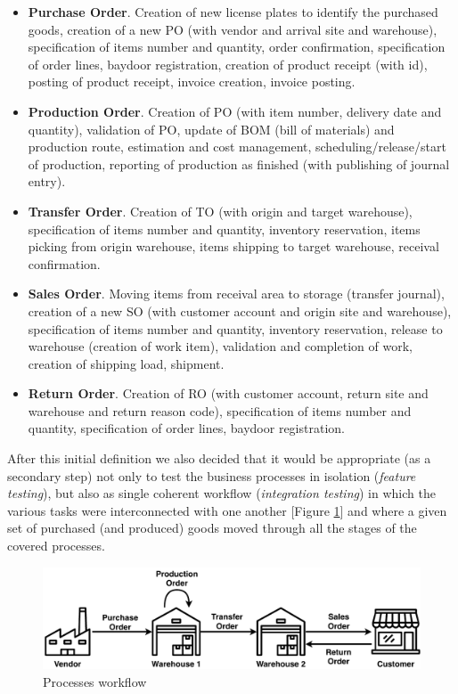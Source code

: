 \begin{itemize}
    \item \textbf{Purchase Order}. Creation of new license plates to identify the purchased goods, creation of a new PO (with vendor and arrival site and warehouse), specification of items number and quantity, order confirmation, specification of order lines, baydoor registration, creation of product receipt (with id), posting of product receipt, invoice creation, invoice posting.
    \item \textbf{Production Order}. Creation of PO (with item number, delivery date and quantity), validation of PO, update of BOM (bill of materials) and production route, estimation and cost management, scheduling/release/start of production, reporting of production as finished (with publishing of journal entry). 
    \item \textbf{Transfer Order}. Creation of TO (with origin and target warehouse), specification of items number and quantity, inventory reservation, items picking from origin warehouse, items shipping to target warehouse, receival confirmation.
    \item \textbf{Sales Order}. Moving items from receival area to storage (transfer journal), creation of a new SO (with customer account and origin site and warehouse), specification of items number and quantity, inventory reservation, release to warehouse (creation of work item), validation and completion of work, creation of shipping load, shipment.  
    \item \textbf{Return Order}. Creation of RO (with customer account, return site and warehouse and return reason code), specification of items number and quantity, specification of order lines, baydoor registration.
\end{itemize}

After this initial definition we also decided that it would be appropriate (as a secondary step) not only to test the business processes in isolation (\textit{feature testing}), but also as single coherent workflow (\textit{integration testing}) in which the various tasks were interconnected with one another [Figure \ref{fig:processesWorkflow}] and where a given set of purchased (and produced) goods moved through all the stages of the covered processes.

\begin{figure}[ht]
	\centering
	\includegraphics[scale=0.7]{Images/workflow.pdf}
	\caption{Processes workflow}
	\label{fig:processesWorkflow}
\end{figure}

